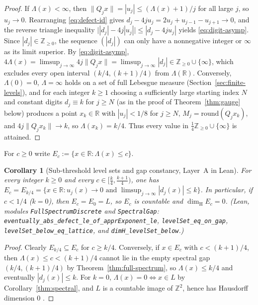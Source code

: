 \documentclass[11pt]{article}
\newtheorem{corollary}[theorem]{Corollary}
\theoremstyle{definition}
\theoremstyle{remark}
\newcommand{\R}{\mathbb{R}}
\newcommand{\Z}{\mathbb{Z}}
\newcommand{\dimH}{\dim_{\mathrm{H}}}
\newcommand{\Lam}{\Lambda}
\begin{document}
\begin{proof}
If $\Lam(x)<\infty$, then $\|Q_jx\|=|u_j|\le(\Lam(x)+1)/j$ for all large $j$,
so $u_j\to0$. Rearranging \eqref{eq:defect-id} gives
$d_j-4ju_j=2u_j+u_{j-1}-u_{j+1}\to0$, and the reverse triangle inequality
$\bigl||d_j|-4j|u_j|\bigr|\le|d_j-4ju_j|$ yields \eqref{eq:digit-asymp}.
Since $|d_j|\in\Z_{\ge0}$, the sequence $(|d_j|)$ can only have a nonnegative
integer or $\infty$ as its limit superior. By \eqref{eq:digit-asymp},
$4\Lam(x)=\limsup_{j\to\infty}4j\|Q_jx\|=\limsup_{j\to\infty}|d_j|\in\Z_{\ge0}\cup\{\infty\}$,
which excludes every open interval $(k/4,(k+1)/4)$ from $\Lam(\R)$.
Conversely, $\Lam(0)=0$, $\Lam=\infty$ holds on a set of full Lebesgue measure
(Section~\ref{sec:finite-levels}), and for each integer $k\ge1$ choosing a
sufficiently large starting index $N$ and constant digits $d_j\equiv k$ for
$j\ge N$ (as in the proof of Theorem~\ref{thm:gauge} below) produces a point
$x_k\in\R$ with $|u_j|<1/8$ for $j\ge N$, $M_j=\mathrm{round}(Q_jx_k)$, and
$4j\|Q_jx_k\|\to k$, so $\Lam(x_k)=k/4$. Thus every value in
$\frac14\Z_{\ge0}\cup\{\infty\}$ is attained.
\end{proof}

For $c\ge0$ write $E_c:=\{x\in\R:\Lam(x)\le c\}$.

\begin{corollary}[Sub-threshold level sets and gap constancy, Layer~A in Lean]\label{thm:sub}
For every integer $k\ge0$ and every $c\in\bigl[\frac{k}{4},\frac{k+1}{4}\bigr)$,
one has $E_c=E_{k/4}=\{x\in\R:u_j(x)\to0\text{ and }\limsup_{j\to\infty}|d_j(x)|\le k\}$.
In particular, if $c<1/4$ ($k=0$), then $E_c=E_0=L$, so $E_c$ is countable and
$\dimH E_c=0$.
(Lean, modules \texttt{FullSpectrumDiscrete} and \texttt{SpectralGap}:
\texttt{eventually\_\allowbreak abs\_\allowbreak defect\_\allowbreak le\_\allowbreak of\_\allowbreak apprExponent\_\allowbreak le},
\texttt{levelSet\_\allowbreak eq\_\allowbreak on\_\allowbreak gap},
\texttt{levelSet\_\allowbreak below\_\allowbreak eq\_\allowbreak lattice}, and
\texttt{dimH\_\allowbreak levelSet\_\allowbreak below}.)
\end{corollary}

\begin{proof}
Clearly $E_{k/4}\subseteq E_c$ for $c\ge k/4$. Conversely, if $x\in E_c$ with
$c<(k+1)/4$, then $\Lam(x)\le c<(k+1)/4$ cannot lie in the empty spectral gap
$(k/4,(k+1)/4)$ by Theorem~\ref{thm:full-spectrum}, so $\Lam(x)\le k/4$ and
eventually $|d_j(x)|\le k$. For $k=0$, $\Lam(x)=0\iff x\in L$ by
Corollary~\ref{thm:spectral}, and $L$ is a countable image of $\Z^2$, hence has
Hausdorff dimension $0$ \cite{Falconer}.
\end{proof}
\end{document}
